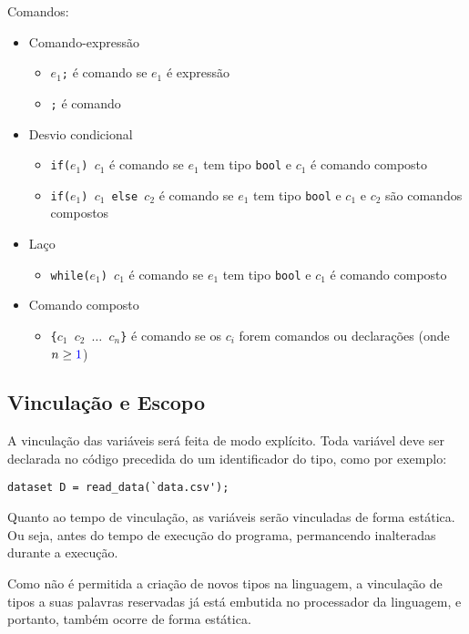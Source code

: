 \documentclass[12pt]{article}
\newcommand{\blu}{\textcolor{blue}}
\begin{document}
Comandos:

\begin{itemize}
\item Comando-expressão
	\begin{itemize}
	\item {\tt $e_1$;} é comando se $e_1$ é expressão
    \item {\tt ;} é comando
	\end{itemize}
\item Desvio condicional
	\begin{itemize}
	\item {\tt if($e_1$) $c_1$} é comando se $e_1$ tem tipo {\tt bool} e 
    $c_1$ é comando composto
    \item {\tt if($e_1$) $c_1$ else $c_2$} é comando se 
    $e_1$ tem tipo {\tt bool} e
    $c_1$ e $c_2$ são comandos compostos
	\end{itemize}
\item Laço
	\begin{itemize}
    \item {\tt while($e_1$) $c_1$} é comando se
    $e_1$ tem tipo {\tt bool} e
    $c_1$ é comando composto
    \end{itemize}
\item Comando composto
	\begin{itemize}
    \item {\tt\{$c_1$ $c_2$ $\ldots$ $c_n$\}} é comando se os $c_i$ forem comandos
    ou declarações (onde $n\geq \blu{1}$)
    \end{itemize}
\end{itemize}

\subsection{Vinculação e Escopo}

A vinculação das variáveis será feita de modo explícito. Toda variável deve ser declarada no código precedida do um identificador do tipo, como por exemplo:

\begin{verbatim}
dataset D = read_data(`data.csv');
\end{verbatim}

Quanto ao tempo de vinculação, as variáveis serão vinculadas de forma estática. Ou seja, antes do tempo de execução do programa, permancendo inalteradas durante a execução.

Como não é permitida a criação de novos tipos na linguagem, a vinculação de tipos a suas palavras reservadas já está embutida no processador da linguagem, e portanto, também ocorre de forma estática.
\end{document}
